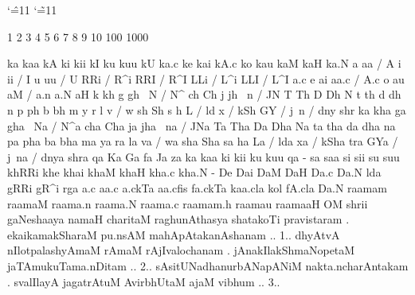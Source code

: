 \documentclass[12pt]{article}
\newcommand\gu{\catcode`\^=11
            \catcode`\~=11
           \fontspec[Script=Gujarati,Mapping=itrans-sguj]{Shruti}
           }
\begin{document}
{\gu
1 2 3 4 5 6 7 8 9 10 100 1000

ka kaa kA ki kii kI ku kuu kU ka.c ke kai kA.c ko kau kaM kaH ka.N 
\bigskip
a     aa / A       i      ii / I       u     uu / U 
RRi / R^i    RRI / R^I    LLi / L^i    LLI / L^I
a.c     e      ai     aa.c / A.c   o     au     aM / a.n   a.N   aH
\bigskip
k     kh     g     gh     ~N / N^
ch    Ch     j     jh     ~n / JN
T     Th     D     Dh     N
t     th     d     dh     n
p     ph     b     bh     m
y     r      l     v / w
sh    Sh     s     h      L / ld
x / kSh     GY / j~n / dny     shr
ka     kha     ga     gha     ~Na / N^a
cha    Cha     ja     jha     ~na / JNa
Ta     Tha     Da     Dha     Na
ta     tha     da     dha     na
pa     pha     ba     bha     ma
ya     ra      la     va / wa
sha    Sha     sa     ha      La / lda
xa / kSha  tra   GYa / j~na / dnya     shra
qa Ka Ga fa Ja za 
\bigskip
ka kaa ki kii ku kuu qa - sa saa si sii su suu
khRRi khe khai khaM khaH kha.c kha.N - De Dai DaM DaH Da.c Da.N
lda gRRi gR^i rga a.c aa.c a.ckTa aa.cfis fa.ckTa kaa.cla kol fA.cla Da.N 
raamam raamaM raama.n raama.N raama.c raamam.h raamau raamaaH
\bigskip
OM shrii gaNeshaaya namaH 
\bigskip
charitaM raghunAthasya shatakoTi pravistaram .
ekaikamakSharaM pu.nsAM mahApAtakanAshanam .. 1..
dhyAtvA nIlotpalashyAmaM rAmaM rAjIvalochanam .
jAnakIlakShmaNopetaM jaTAmukuTama.nDitam .. 2..
sAsitUNadhanurbANapANiM nakta.ncharAntakam .
svalIlayA jagatrAtuM AvirbhUtaM ajaM vibhum .. 3..
}
\end{document}
